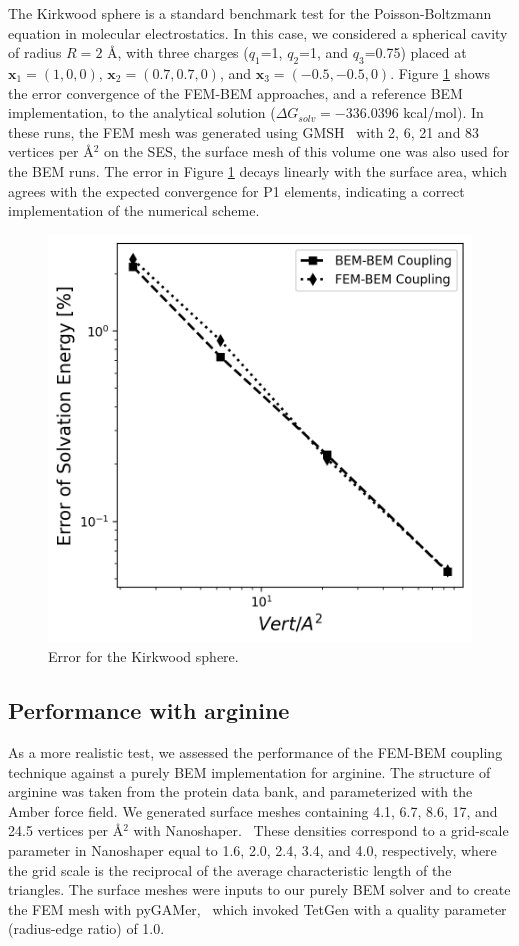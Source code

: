 The Kirkwood sphere \cite{Kirkwood1934} is a standard benchmark test for the Poisson-Boltzmann equation in molecular electrostatics. 
In this case, we considered a spherical cavity of radius $R=2$ \AA, with three charges ($q_1$=1, $q_2$=1, and $q_3$=0.75) placed at $\mathbf{x}_1=(1,0,0)$, $\mathbf{x}_2=(0.7,0.7,0)$, and $\mathbf{x}_3=(-0.5,-0.5,0)$.
Figure \ref{fig:error_sphere} shows the error convergence of the FEM-BEM approaches, and a reference BEM implementation, to the analytical solution ($\Delta G_{solv}= -336.0396$ kcal/mol). 
In these runs, the FEM mesh was generated using GMSH~\cite{geuzaine2009gmsh} 
with %
2, 6, 21 and 83 vertices per \AA$^2$ on the SES, the surface mesh of this volume one was also used for the BEM runs. 
The error in Figure \ref{fig:error_sphere} decays linearly with the surface area, which agrees with the expected convergence for P1 elements, indicating a correct implementation of the numerical scheme. 

\begin{figure}
  \centering
  \includegraphics[width=0.45\linewidth]{DolfinX_Sphere_const_coeff_error.png}
  \caption{Error for the Kirkwood sphere.  }
  \label{fig:error_sphere}
\end{figure}

\subsection*{\sffamily \large Performance with arginine}

As a more realistic test, we assessed the performance of the FEM-BEM coupling technique against a purely BEM implementation for arginine.
The structure of arginine was taken from the protein data bank, and parameterized with the Amber\cite{ponder2003force} force field. 
We generated surface meshes containing 4.1, 6.7, 8.6, 17, and 24.5 vertices per \AA$^2$ with Nanoshaper.~\cite{decherchi2013general}
These densities correspond to a grid-scale parameter in Nanoshaper equal to 1.6, 2.0, 2.4, 3.4, and 4.0, respectively, where the grid scale is the reciprocal of the average characteristic length of the triangles.
The surface meshes were inputs to our purely BEM solver and to create the FEM mesh with pyGAMer,~\cite{lee2020open} which invoked TetGen\cite{hang2015tetgen} with a quality parameter (radius-edge ratio) of 1.0.

